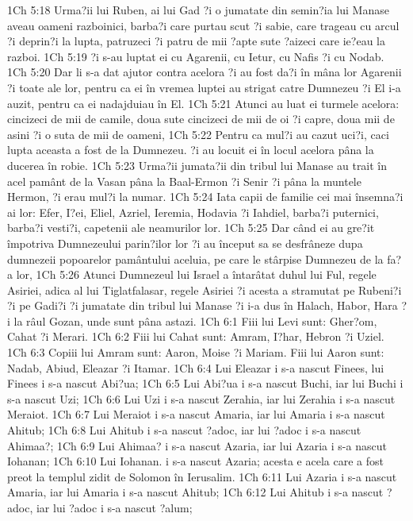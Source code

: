 1Ch 5:18  Urma?ii lui Ruben, ai lui Gad ?i o jumatate din semin?ia lui Manase aveau oameni razboinici, barba?i care purtau scut ?i sabie, care trageau cu arcul ?i deprin?i la lupta, patruzeci ?i patru de mii ?apte sute ?aizeci care ie?eau la razboi.
1Ch 5:19  ?i s-au luptat ei cu Agarenii, cu Ietur, cu Nafis ?i cu Nodab.
1Ch 5:20  Dar li s-a dat ajutor contra acelora ?i au fost da?i în mâna lor Agarenii ?i toate ale lor, pentru ca ei în vremea luptei au strigat catre Dumnezeu ?i El i-a auzit, pentru ca ei nadajduiau în El.
1Ch 5:21  Atunci au luat ei turmele acelora: cincizeci de mii de camile, doua sute cincizeci de mii de oi ?i capre, doua mii de asini ?i o suta de mii de oameni,
1Ch 5:22  Pentru ca mul?i au cazut uci?i, caci lupta aceasta a fost de la Dumnezeu. ?i au locuit ei în locul acelora pâna la ducerea în robie.
1Ch 5:23  Urma?ii jumata?ii din tribul lui Manase au trait în acel pamânt de la Vasan pâna la Baal-Ermon ?i Senir ?i pâna la muntele Hermon, ?i erau mul?i la numar.
1Ch 5:24  Iata capii de familie cei mai însemna?i ai lor: Efer, I?ei, Eliel, Azriel, Ieremia, Hodavia ?i Iahdiel, barba?i puternici, barba?i vesti?i, capetenii ale neamurilor lor.
1Ch 5:25  Dar când ei au gre?it împotriva Dumnezeului parin?ilor lor ?i au început sa se desfrâneze dupa dumnezeii popoarelor pamântului aceluia, pe care le stârpise Dumnezeu de la fa?a lor,
1Ch 5:26  Atunci Dumnezeul lui Israel a întarâtat duhul lui Ful, regele Asiriei, adica al lui Tiglatfalasar, regele Asiriei ?i acesta a stramutat pe Rubeni?i ?i pe Gadi?i ?i jumatate din tribul lui Manase ?i i-a dus în Halach, Habor, Hara ?i la râul Gozan, unde sunt pâna astazi.
1Ch 6:1  Fiii lui Levi sunt: Gher?om, Cahat ?i Merari.
1Ch 6:2  Fiii lui Cahat sunt: Amram, I?har, Hebron ?i Uziel.
1Ch 6:3  Copiii lui Amram sunt: Aaron, Moise ?i Mariam. Fiii lui Aaron sunt: Nadab, Abiud, Eleazar ?i Itamar.
1Ch 6:4  Lui Eleazar i s-a nascut Finees, lui Finees i s-a nascut Abi?ua;
1Ch 6:5  Lui Abi?ua i s-a nascut Buchi, iar lui Buchi i s-a nascut Uzi;
1Ch 6:6  Lui Uzi i s-a nascut Zerahia, iar lui Zerahia i s-a nascut Meraiot.
1Ch 6:7  Lui Meraiot i s-a nascut Amaria, iar lui Amaria i s-a nascut Ahitub;
1Ch 6:8  Lui Ahitub i s-a nascut ?adoc, iar lui ?adoc i s-a nascut Ahimaa?;
1Ch 6:9  Lui Ahimaa? i s-a nascut Azaria, iar lui Azaria i s-a nascut Iohanan;
1Ch 6:10  Lui Iohanan. i s-a nascut Azaria; acesta e acela care a fost preot la templul zidit de Solomon în Ierusalim.
1Ch 6:11  Lui Azaria i s-a nascut Amaria, iar lui Amaria i s-a nascut Ahitub;
1Ch 6:12  Lui Ahitub i s-a nascut ?adoc, iar lui ?adoc i s-a nascut ?alum;
